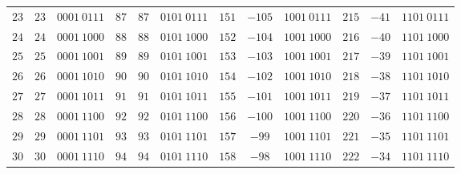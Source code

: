 \begin{center}
\begin{minipage}{0.5\linewidth}
\begin{center}
\begin{tabular}{|c|c|c||c|c|c||c|c|c||c|c|c|}
            \textcolor{numColor}{$23$} & \textcolor{twoColor}{$23$} & $0001~0111$ & \textcolor{numColor}{$87$} & \textcolor{twoColor}{$87$} & $0101~0111$ & \textcolor{numColor}{$151$} & \textcolor{twoColor}{$-105$} & $1001~0111$ & \textcolor{numColor}{$215$} & \textcolor{twoColor}{$-41$} & $1101~0111$\\ 
            \textcolor{numColor}{$24$} & \textcolor{twoColor}{$24$} & $0001~1000$ & \textcolor{numColor}{$88$} & \textcolor{twoColor}{$88$} & $0101~1000$ & \textcolor{numColor}{$152$} & \textcolor{twoColor}{$-104$} & $1001~1000$ & \textcolor{numColor}{$216$} & \textcolor{twoColor}{$-40$} & $1101~1000$\\ 
            \textcolor{numColor}{$25$} & \textcolor{twoColor}{$25$} & $0001~1001$ & \textcolor{numColor}{$89$} & \textcolor{twoColor}{$89$} & $0101~1001$ & \textcolor{numColor}{$153$} & \textcolor{twoColor}{$-103$} & $1001~1001$ & \textcolor{numColor}{$217$} & \textcolor{twoColor}{$-39$} & $1101~1001$\\ 
            \textcolor{numColor}{$26$} & \textcolor{twoColor}{$26$} & $0001~1010$ & \textcolor{numColor}{$90$} & \textcolor{twoColor}{$90$} & $0101~1010$ & \textcolor{numColor}{$154$} & \textcolor{twoColor}{$-102$} & $1001~1010$ & \textcolor{numColor}{$218$} & \textcolor{twoColor}{$-38$} & $1101~1010$\\ 
            \textcolor{numColor}{$27$} & \textcolor{twoColor}{$27$} & $0001~1011$ & \textcolor{numColor}{$91$} & \textcolor{twoColor}{$91$} & $0101~1011$ & \textcolor{numColor}{$155$} & \textcolor{twoColor}{$-101$} & $1001~1011$ & \textcolor{numColor}{$219$} & \textcolor{twoColor}{$-37$} & $1101~1011$\\ 
            \textcolor{numColor}{$28$} & \textcolor{twoColor}{$28$} & $0001~1100$ & \textcolor{numColor}{$92$} & \textcolor{twoColor}{$92$} & $0101~1100$ & \textcolor{numColor}{$156$} & \textcolor{twoColor}{$-100$} & $1001~1100$ & \textcolor{numColor}{$220$} & \textcolor{twoColor}{$-36$} & $1101~1100$\\ 
            \textcolor{numColor}{$29$} & \textcolor{twoColor}{$29$} & $0001~1101$ & \textcolor{numColor}{$93$} & \textcolor{twoColor}{$93$} & $0101~1101$ & \textcolor{numColor}{$157$} & \textcolor{twoColor}{$-99$} & $1001~1101$ & \textcolor{numColor}{$221$} & \textcolor{twoColor}{$-35$} & $1101~1101$\\ 
            \textcolor{numColor}{$30$} & \textcolor{twoColor}{$30$} & $0001~1110$ & \textcolor{numColor}{$94$} & \textcolor{twoColor}{$94$} & $0101~1110$ & \textcolor{numColor}{$158$} & \textcolor{twoColor}{$-98$} & $1001~1110$ & \textcolor{numColor}{$222$} & \textcolor{twoColor}{$-34$} & $1101~1110$\\ 

\end{tabular}
\end{center}
\end{minipage}
\end{center}
